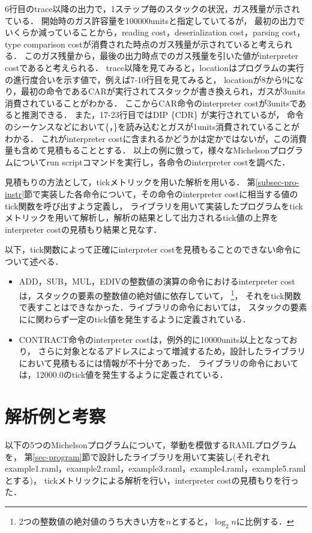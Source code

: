 \documentclass{kuisthesis}
\begin{document}
6行目のtrace以降の出力で，1ステップ毎のスタックの状況，ガス残量が示されている．
開始時のガス許容量を100000unitsと指定していてるが，
最初の出力でいくらか減っていることから，reading cost，deserialization cost，parsing cost，type comparison costが消費された時点のガス残量が示されていると考えられる．
このガス残量から，最後の出力時点でのガス残量を引いた値がinterpreter costであると考えられる．
trace以降を見てみると，locationはプログラムの実行の進行度合いを示す値で，例えば7-10行目を見てみると，
locationが8から9になり，最初の命令であるCARが実行されてスタックが書き換えられ，ガスが3units消費されていることがわかる．
ここからCAR命令のinterpreter costが3unitsであると推測できる．
また，17-23行目ではDIP \{CDR\} が実行されているが，
命令のシーケンスなどにおいて\{，\}を読み込むとガスが1units消費されていることがわかる．
これがinterpreter costに含まれるかどうかは定かではないが，この消費量も含めて見積もることとする．
以上の例に倣って，様々なMichelsonプログラムについてrun scriptコマンドを実行し，各命令のinterpreter costを調べた．

見積もりの方法として，tickメトリックを用いた解析を用いる．
第\ref{subsec-pro-instr}節で実装した各命令について，その命令のinterpreter costに相当する値のtick関数を呼び出すよう定義し，
ライブラリを用いて実装したプログラムをtickメトリックを用いて解析し，解析の結果として出力されるtick値の上界をinterpreter costの見積もり結果と見なす．

以下，tick関数によって正確にinterpreter costを見積もることのできない命令について述べる．
\begin{itemize}
  \item ADD，SUB，MUL，EDIVの整数値の演算の命令におけるinterpreter costは，スタックの要素の整数値の絶対値に依存していて，
  \footnote{2つの整数値の絶対値のうち大きい方を$n$とすると，$\log_2 n$に比例する．}，
  それをtick関数で表すことはできなかった．ライブラリの命令においては，
  スタックの要素にに関わらず一定のtick値を発生するように定義されている．
  \item CONTRACT命令のinterpreter costは，例外的に10000units以上となっており，
  さらに対象となるアドレスによって増減するため，設計したライブラリにおいて見積もるには情報が不十分であった．
  ライブラリの命令においては，12000.0のtick値を発生するように定義されている．
\end{itemize}

\section{解析例と考察}
以下の5つのMichelsonプログラムについて，挙動を模倣するRAMLプログラムを，
第\ref{sec-program}節で設計したライブラリを用いて実装し(それぞれexample1.raml，example2.raml，example3.raml，example4.raml，example5.ramlとする)，
tickメトリックによる解析を行い，interpreter costの見積もりを行った．
\end{document}
